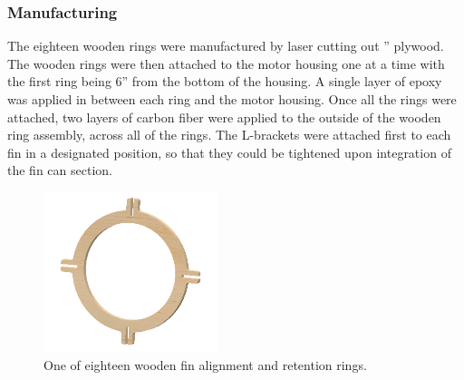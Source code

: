 \subsubsection*{Manufacturing}
The eighteen wooden rings were manufactured by laser cutting out ” plywood. The wooden rings were then attached to the motor housing one at a time with the first ring being 6'' from the bottom of the housing. A single layer of epoxy was applied in between each ring and the motor housing. Once all the rings were attached, two layers of carbon fiber were applied to the outside of the wooden ring assembly, across all of the rings. The L-brackets were attached first to each fin in a designated position, so that they could be tightened upon integration of the fin can section.
\begin{figure}[H]
	\centering
	\includegraphics[width=2in]{imgs/retentionring.png}
	\caption{One of eighteen wooden fin alignment and retention rings.}
	\label{fig:retentionring}
\end{figure}
